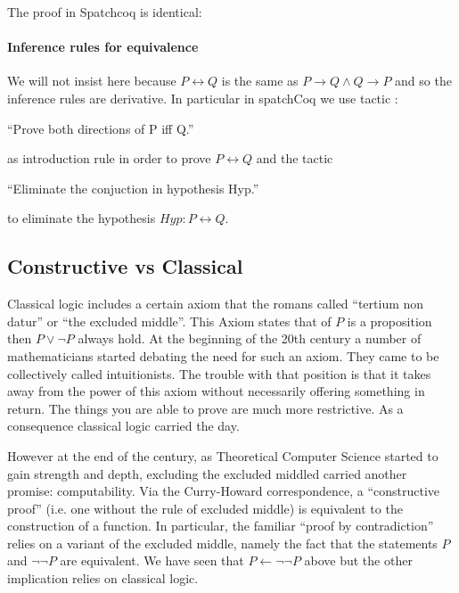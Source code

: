 \begin{itemize}
The proof in Spatchcoq is identical:


\end{itemize}

\paragraph{Inference rules for equivalence}

We will not insist here because $P\leftrightarrow Q$ is the same as $P\rightarrow Q \land Q\rightarrow P$ and so the inference rules are derivative. In particular
 in spatchCoq we use  tactic :
 
``Prove both directions of P iff Q.''  

as introduction rule in order to prove $P\leftrightarrow Q$ and the  tactic 


``Eliminate the conjuction in hypothesis Hyp.'' 


to eliminate the hypothesis $Hyp: P\leftrightarrow Q$.



 





\subsection{Constructive vs Classical}\label{subs:Constructive vs Classical}

Classical logic includes a certain axiom that the romans called ``tertium non datur'' or ``the excluded middle''. This Axiom states that of $P$ is a proposition then $P\lor \neg P$ always hold. At the beginning of the 20th century a number of mathematicians started debating the need for such an axiom. They came to be collectively called intuitionists. The trouble with that position is that it takes away from the power of this axiom without necessarily offering something in return. The things you are able to prove are much more restrictive. As a consequence classical logic carried the day.

However at the end of the century, as Theoretical Computer Science started to gain strength and depth, excluding the excluded middled carried another promise: computability. Via the Curry-Howard correspondence, a ``constructive proof'' (i.e. one without the rule of excluded middle) is equivalent to the construction of a function. In particular, the familiar ``proof by contradiction'' relies on a variant of the excluded middle, namely the fact that the statements $P$ and $\neg \neg P$ are equivalent. We have seen that $P \leftarrow \neg \neg P$ above but the other implication relies on classical logic.

